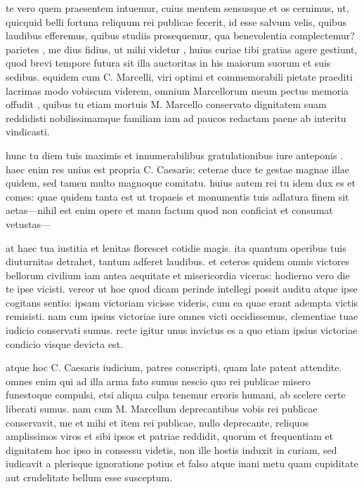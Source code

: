  te vero quem praesentem intuemur, cuius mentem sensusque et os cernimus, ut, quicquid belli fortuna reliquum rei publicae fecerit, id esse salvum velis, quibus laudibus efferemus, quibus studiis prosequemur, qua benevolentia complectemur? parietes , me dius fidius, ut mihi videtur , huius curiae tibi gratias agere gestiunt, quod brevi tempore futura sit illa auctoritas in his maiorum suorum et suis sedibus. equidem cum C. Marcelli, viri optimi et commemorabili pietate praediti lacrimas modo vobiscum viderem, omnium Marcellorum meum pectus memoria offudit , quibus tu etiam mortuis M. Marcello conservato dignitatem suam reddidisti nobilissimamque familiam iam ad paucos redactam paene ab interitu vindicasti.

 hunc tu diem tuis maximis et innumerabilibus gratulationibus iure anteponis . haec enim res unius est propria C. Caesaris; ceterae duce te gestae magnae illae quidem, sed tamen multo magnoque comitatu. huius autem rei tu idem dux es et comes: quae quidem tanta est ut tropaeis et monumentis tuis adlatura finem sit aetas—nihil est enim opere et manu factum quod non conficiat et consumat vetustas—

 at haec tua iustitia et lenitas florescet cotidie magis. ita quantum operibus tuis diuturnitas detrahet, tantum adferet laudibus. et ceteros quidem omnis victores bellorum civilium iam antea aequitate et misericordia viceras: hodierno vero die te ipse vicisti. vereor ut hoc quod dicam perinde intellegi possit auditu atque ipse cogitans sentio: ipsam victoriam vicisse videris, cum ea quae erant adempta victis remisisti. nam cum ipsius victoriae iure omnes victi occidissemus, clementiae tuae iudicio conservati sumus. recte igitur unus invictus es a quo etiam ipsius victoriae condicio visque devicta est.

 atque hoc C. Caesaris iudicium, patres conscripti, quam late pateat attendite. omnes enim qui ad illa arma fato sumus nescio quo rei publicae misero funestoque compulsi, etsi aliqua culpa tenemur erroris humani, ab scelere certe liberati sumus. nam cum M. Marcellum deprecantibus vobis rei publicae conservavit, me et mihi et item rei publicae, nullo deprecante, reliquos amplissimos viros et sibi ipsos et patriae reddidit, quorum et frequentiam et dignitatem hoc ipso in consessu videtis, non ille hostis induxit in curiam, sed iudicavit a plerisque ignoratione potius et falso atque inani metu quam cupiditate aut crudelitate bellum esse susceptum.

